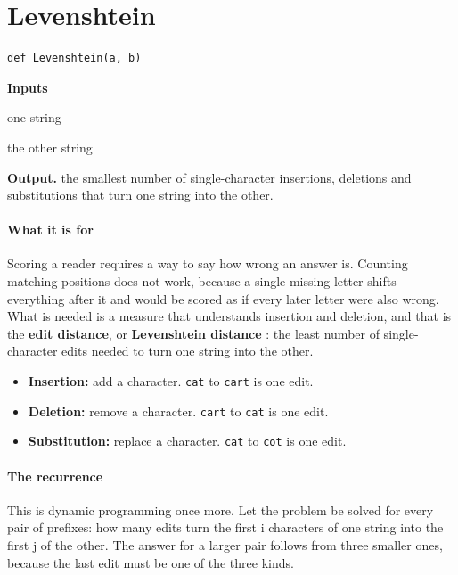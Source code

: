 \section{Levenshtein}
\begin{lstlisting}[style=sig]
def Levenshtein(a, b)
\end{lstlisting}

\noindent\textbf{Inputs}
\begin{description}[leftmargin=2.2em,style=nextline,font=\normalfont\ttfamily]\setlength\itemsep{1pt}
  \item[{a}] \normalfont one string
  \item[{b}] \normalfont the other string
\end{description}

\noindent\textbf{Output.} the smallest number of single-character insertions, deletions and substitutions that turn one string into the other.


\paragraph{What it is for}
Scoring a reader requires a way to say how wrong an answer is. Counting matching positions does not work, because a single missing letter shifts everything after it and would be scored as if every later letter were also wrong. What is needed is a measure that understands insertion and deletion, and that is the \textbf{edit distance}, or \textbf{Levenshtein distance} \cite{levenshtein1966}: the least number of single-character edits needed to turn one string into the other.


\begin{itemize}\setlength\itemsep{0pt}
  \item \textbf{Insertion:} add a character. \texttt{cat} to \texttt{cart} is one edit.
  \item \textbf{Deletion:} remove a character. \texttt{cart} to \texttt{cat} is one edit.
  \item \textbf{Substitution:} replace a character. \texttt{cat} to \texttt{cot} is one edit.
\end{itemize}

\paragraph{The recurrence}
This is dynamic programming once more. Let the problem be solved for every pair of prefixes: how many edits turn the first i characters of one string into the first j of the other. The answer for a larger pair follows from three smaller ones, because the last edit must be one of the three kinds.


